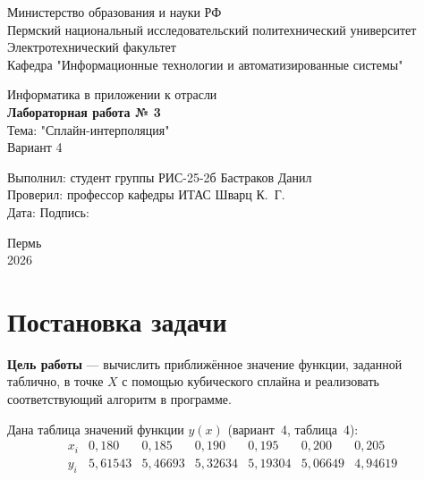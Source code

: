 \documentclass[14pt,a4paper]{extarticle}
\begin{document}
\begin{titlepage}
    \centering
    \large
    Министерство образования и науки РФ\\[0.3cm]
    Пермский национальный исследовательский политехнический университет\\[0.3cm]
    Электротехнический факультет\\[0.3cm]
    Кафедра "Информационные технологии и автоматизированные системы"

    \vspace{3.5cm}
    {\Large Информатика в приложении к отрасли}\\[0.4cm]
    {\Large\bfseries Лабораторная работа № 3}\\[0.6cm]

    Тема: "Сплайн-интерполяция"\\[0.2cm]
    Вариант 4

    \vspace{4.5cm}
    \begin{flushleft}
        \large
        Выполнил: студент группы РИС-25-2б \hfill Бастраков Данил\\[0.5cm]
        Проверил: профессор кафедры ИТАС \hfill Шварц К.~Г.\\[0.5cm]
        Дата: \underline{\hspace{3cm}} \hfill Подпись: \underline{\hspace{4cm}}
    \end{flushleft}

    \vfill
    Пермь\\ 2026
\end{titlepage}

\tableofcontents
\newpage

\section{Постановка задачи}

\textbf{Цель работы} --- вычислить приближённое значение функции,
заданной таблично, в точке $X$ с помощью кубического сплайна и
реализовать соответствующий алгоритм в программе.

Дана таблица значений функции $y(x)$ (вариант~4, таблица~4):
\begin{equation}
\begin{array}{c|cccccc}
    x_i & 0{,}180 & 0{,}185 & 0{,}190 & 0{,}195 & 0{,}200 & 0{,}205\\
    \hline
    y_i & 5{,}61543 & 5{,}46693 & 5{,}32634 & 5{,}19304 & 5{,}06649 & 4{,}94619
\end{array}
\label{eq:data}
\end{equation}
\end{document}
